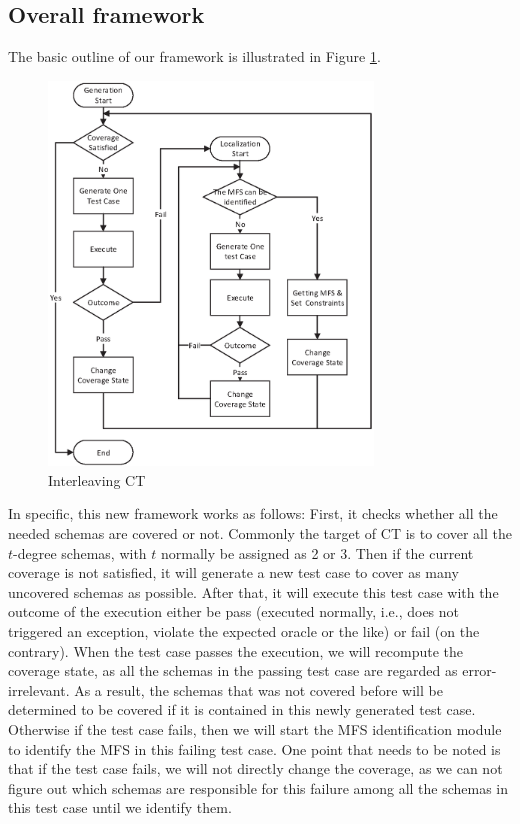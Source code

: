 \documentclass{sig-alternate}
\begin{document}
\subsection{Overall framework}
 The basic outline of our framework is illustrated in Figure \ref{new-life}.
\begin{figure}
 \includegraphics[width=3.4in]{baicOutline.eps}
\caption{Interleaving CT}
\label{new-life}
\end{figure}
In specific, this new framework works as follows: First, it checks whether all the needed schemas are covered or not. Commonly the target of CT is to cover all the $t$-degree schemas, with $t$ normally be assigned as 2 or 3. Then if the current coverage is not satisfied, it will generate a new test case to cover as many uncovered schemas as possible. After that, it will execute this test case with the outcome of the execution either be pass (executed normally, i.e., does not triggered an exception, violate the expected oracle or the like) or fail (on the contrary). When the test case passes the execution, we will recompute the coverage state, as all the schemas in the passing test case are regarded as error-irrelevant. As a result, the schemas that was not covered before will be determined to be covered if it is contained in this newly generated test case. Otherwise if the test case fails, then we will start the MFS identification module to identify the MFS in this failing test case. One point that needs to be noted is that if the test case fails, we will not directly change the coverage, as we can not figure out which schemas are responsible for this failure among all the schemas in this test case until we identify them.
\end{document}
